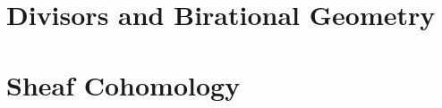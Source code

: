 \documentclass[11pt,a4paper,oneside,openany]{book}
\begin{document}
\part{Divisors and Birational Geometry}









\part{Sheaf Cohomology}






\backmatter


% 
\end{document}
